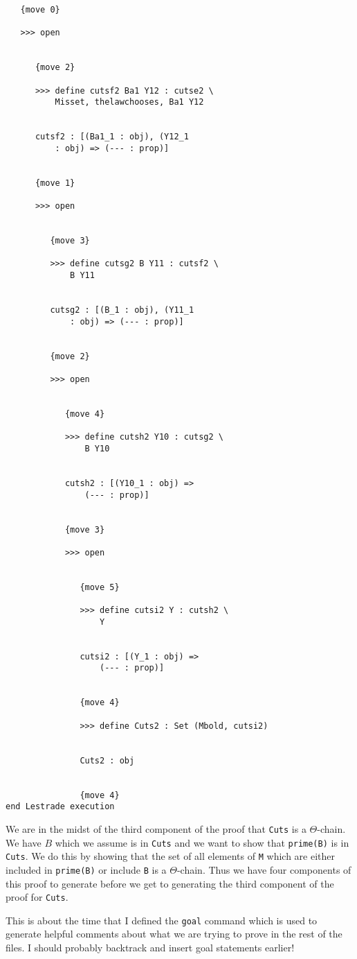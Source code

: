 \documentclass[12pt]{article}
\begin{document}
\begin{verbatim}
   {move 0}

   >>> open


      {move 2}

      >>> define cutsf2 Ba1 Y12 : cutse2 \
          Misset, thelawchooses, Ba1 Y12


      cutsf2 : [(Ba1_1 : obj), (Y12_1 
          : obj) => (--- : prop)]


      {move 1}

      >>> open


         {move 3}

         >>> define cutsg2 B Y11 : cutsf2 \
             B Y11


         cutsg2 : [(B_1 : obj), (Y11_1 
             : obj) => (--- : prop)]


         {move 2}

         >>> open


            {move 4}

            >>> define cutsh2 Y10 : cutsg2 \
                B Y10


            cutsh2 : [(Y10_1 : obj) => 
                (--- : prop)]


            {move 3}

            >>> open


               {move 5}

               >>> define cutsi2 Y : cutsh2 \
                   Y


               cutsi2 : [(Y_1 : obj) => 
                   (--- : prop)]


               {move 4}

               >>> define Cuts2 : Set (Mbold, cutsi2)


               Cuts2 : obj


               {move 4}
end Lestrade execution
\end{verbatim}

We are in the midst of the third component of the proof that {\tt Cuts} is a $\Theta$-chain.  We have $B$ which we assume is in {\tt Cuts}
and we want to show that {\tt prime(B)} is in {\tt Cuts}.  We do this by showing that the set of all elements of {\tt M} which are either included
in {\tt prime(B)} or include {\tt B} is a $\Theta$-chain.  Thus we have four components of this proof to generate before we get to generating the third component of
the proof for {\tt Cuts}.

This is about the time that I defined the {\tt goal} command which is used to generate helpful comments about what we are trying to prove in the rest of the files.  I should probably
backtrack and insert goal statements earlier!
\end{document}
